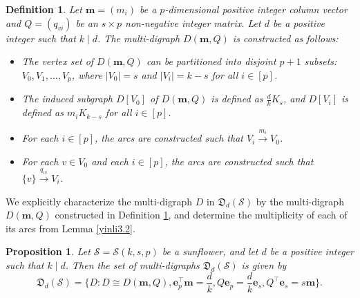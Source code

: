\documentclass{article}
\newtheorem{pro}[thm]{Proposition}
\newtheorem{defi}[thm]{Definition}
\begin{document}
\begin{defi}\label{defi3.3}
Let $\mathbf{m}=(m_i)$ be a $p$-dimensional positive integer column vector and $Q=(q_{vi})$ be an $s \times p$ non-negative integer matrix.
Let $d$ be a positive integer such that $k \mid d$.
The multi-digraph $D(\mathbf{m},Q)$ is constructed as follows:
\begin{itemize}
\item The vertex set of $D(\mathbf{m},Q)$ can be partitioned into disjoint $p+1$ subsets: $V_0,V_1,\ldots,V_p$, where $|V_0|=s$ and $|V_i|=k-s$ for all $i \in [p]$.
\item The induced subgraph $D[V_0]$ of $D(\mathbf{m},Q)$ is defined as $\frac{d}{k}K_{s}$, and $D[V_i]$ is defined as $m_iK_{k-s}$ for all $i \in [p]$.
\item For each $i \in [p]$, the arcs are constructed such that $V_i \xrightarrow{m_i} V_0$.
\item For each $v \in V_0$ and each $i \in [p]$, the arcs are constructed such that $\{v\} \xrightarrow{q_{vi}} V_i $.
\end{itemize}
\end{defi}


We explicitly characterize the multi-digraph $D$ in $\mathfrak{D}_d(\mathcal{S})$ by the multi-digraph $D(\mathbf{m},Q)$ constructed in Definition \ref{defi3.3}, and determine the multiplicity of each of its arcs from Lemma \ref{yinli3.2}.


\begin{pro}\label{pro3.4}
Let $\mathcal{S}=\mathcal{S}(k,s,p)$ be a sunflower, and let $d$ be a positive integer such that $k \mid d$. Then the set of multi-digraphs $\mathfrak{D}_d(\mathcal{S})$ is given by
$$\mathfrak{D}_d(\mathcal{S})=
\{D: D \cong D(\mathbf{m},Q), \mathbf{e}_p^\top\mathbf{m}=\frac{d}{k},Q\mathbf{e}_p=\frac{d}{k}\mathbf{e}_s,Q^{\top}\mathbf{e}_s=s\mathbf{m}\}.$$
\end{pro}
\end{document}
